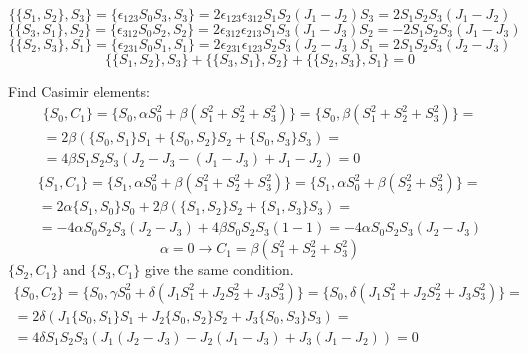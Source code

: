\documentclass[12pt]{article}
\theoremstyle{definition}
\begin{document}
\begin{enumerate}
\begin{itemize}
\begin{multline}
        \end{multline}
        \begin{equation}
            \{\{S_1,S_2\},S_3\}=\{\epsilon_{123}S_0S_3,S_3\}=2\epsilon_{123}\epsilon_{312}S_1S_2(J_1-J_2)S_3=2S_1S_2S_3(J_1-J_2)
        \end{equation}
        \begin{equation}
            \{\{S_3,S_1\},S_2\}=\{\epsilon_{312}S_0S_2,S_2\}=2\epsilon_{312}\epsilon_{213}S_1S_3(J_1-J_3)S_2=-2S_1S_2S_3(J_1-J_3)
        \end{equation}
        \begin{equation}
            \{\{S_2,S_3\},S_1\}=\{\epsilon_{231}S_0S_1,S_1\}=2\epsilon_{231}\epsilon_{123}S_2S_3(J_2-J_3)S_1=2S_1S_2S_3(J_2-J_3)
        \end{equation}
        \begin{equation}
            \{\{S_1,S_2\},S_3\}+\{\{S_3,S_1\},S_2\}+\{\{S_2,S_3\},S_1\}=0
        \end{equation}
    \end{itemize}
    Find Casimir elements:
    \begin{multline}
        \{S_0,C_1\}=\{S_0,\alpha S_0^2+\beta(S_1^2+S_2^2+S_3^2)\}=\{S_0,\beta(S_1^2+S_2^2+S_3^2)\}=\\=2\beta(\{S_0,S_1\}S_1+\{S_0,S_2\}S_2+\{S_0,S_3\}S_3)=\\=4\beta S_1S_2S_3(J_2-J_3-(J_1-J_3)+J_1-J_2)=0
    \end{multline}
    \begin{multline}
        \{S_1,C_1\}=\{S_1,\alpha S_0^2+\beta(S_1^2+S_2^2+S_3^2)\}=\{S_1,\alpha S_0^2+\beta(S_2^2+S_3^2)\}=\\=2\alpha\{S_1,S_0\}S_0+2\beta(\{S_1,S_2\}S_2+\{S_1,S_3\}S_3)=\\=-4\alpha S_0S_2S_3(J_2-J_3)+4\beta S_0S_2S_3(1-1)=-4\alpha S_0S_2S_3(J_2-J_3)
    \end{multline}
    \begin{equation}
        \boxed{\alpha=0\rightarrow C_1=\beta(S_1^2+S_2^2+S_3^2)}
    \end{equation}
    $\{S_2,C_1\}$ and $\{S_3,C_1\}$ give the same condition.
    \begin{multline}
        \{S_0,C_2\}=\{S_0,\gamma S_0^2+\delta(J_1S_1^2+J_2S_2^2+J_3S_3^2)\}=\{S_0,\delta(J_1S_1^2+J_2S_2^2+J_3S_3^2)\}=\\=2\delta(J_1\{S_0,S_1\}S_1+J_2\{S_0,S_2\}S_2+J_3\{S_0,S_3\}S_3)=\\=4\delta S_1S_2S_3(J_1(J_2-J_3)-J_2(J_1-J_3)+J_3(J_1-J_2))=0

\end{multline}
\end{enumerate}
\end{document}
